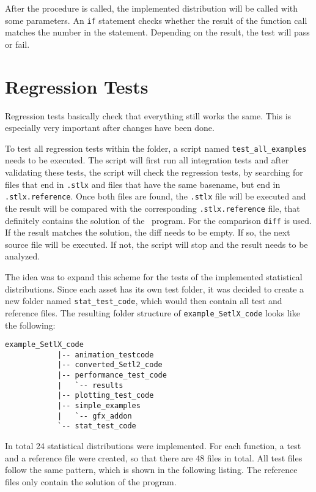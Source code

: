 	After the procedure is called, the implemented distribution will be called with some parameters. An \lstinline{if} statement checks whether the result of the function call matches the number in the statement. Depending on the result, the test will pass or fail.


\section{Regression Tests}

	Regression tests basically check that everything still works the same. This is especially very important after changes have been done.

	To test all regression tests within the folder, a script named \lstinline{test_all_examples} needs to be executed. The script will first run all integration tests and after validating these tests, the script will check the regression tests, by searching for files that end in \lstinline{.stlx} and files that have the same basename, but end in \lstinline{.stlx.reference}. Once both files are found, the \lstinline{.stlx} file will be executed and the result will be compared with the corresponding \lstinline{.stlx.reference} file, that definitely contains the solution of the \setlx\ program. For the comparison \lstinline{diff} is used. If the result matches the solution, the diff needs to be empty. If so, the next source file will be executed. If not, the script will stop and the result needs to be analyzed.

	The idea was to expand this scheme for the tests of the implemented statistical distributions. Since each asset has its own test folder, it was decided to create a new folder named \lstinline{stat_test_code}, which would then contain all test and reference files. The resulting folder structure of \lstinline{example_SetlX_code} looks like the following:
	
	\begin{center}
		\begin{lstlisting}[caption={Folder Structure \lstinline{example\_SetlX\_code}}, label={lis:regressionTests}]
			example_SetlX_code
			|-- animation_testcode
			|-- converted_Setl2_code
			|-- performance_test_code
			|   `-- results
			|-- plotting_test_code
			|-- simple_examples
			|   `-- gfx_addon
			`-- stat_test_code
		\end{lstlisting}
	\end{center}

	In total 24 statistical distributions were implemented. For each function, a test and a reference file were created, so that there are 48 files in total. All test files follow the same pattern, which is shown in the following listing. The reference files only contain the solution of the program.

